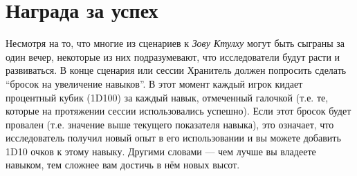 \documentclass[letterpaper,twocolumn,openany, twoside, 11pt, usenames]{cocbook}
\begin{document}
\section*{Награда за успех}

Несмотря на то, что многие из сценариев к {\it Зову Ктулху} могут быть сыграны за один вечер, некоторые из них подразумевают, что исследователи будут расти и развиваться. В конце сценария или сессии Хранитель должен попросить сделать ``бросок на увеличение навыков''. В этот момент каждый игрок кидает процентный кубик (1D100) за каждый навык, отмеченный галочкой (т.е. те, которые на протяжении сессии использовались успешно). Если этот бросок будет провален (т.е. значение выше текущего показателя навыка), это означает, что исследователь получил новый опыт в его использовании и вы можете добавить 1D10 очков к этому навыку. Другими словами --- чем лучше вы владеете навыком, тем сложнее вам достичь в нём новых высот.

\smallbreak
\noindent {}
\end{document}
